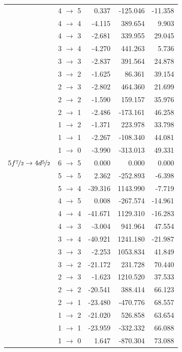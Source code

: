 \begin{table}[b]
\begin{small}
\begin{tabular}{cc|rrr}
&4 $\rightarrow$ 5&0.337&-125.046&-11.358\\
&4 $\rightarrow$ 4&-4.115&389.654&9.903\\
&4 $\rightarrow$ 3&-2.681&339.955&29.045\\
&3 $\rightarrow$ 4&-4.270&441.263&5.736\\
&3 $\rightarrow$ 3&-2.837&391.564&24.878\\
&3 $\rightarrow$ 2&-1.625&86.361&39.154\\
&2 $\rightarrow$ 3&-2.802&464.360&21.699\\
&2 $\rightarrow$ 2&-1.590&159.157&35.976\\
&2 $\rightarrow$ 1&-2.486&-173.161&46.258\\
&1 $\rightarrow$ 2&-1.371&223.978&33.798\\
&1 $\rightarrow$ 1&-2.267&-108.340&44.081\\
&1 $\rightarrow$ 0&-3.990&-313.013&49.331\\[10pt]
$5f\nicefrac{7}{2} \rightarrow 4d\nicefrac{5}{2}$ &6 $\rightarrow$ 5&0.000&0.000&0.000\\
&5 $\rightarrow$ 5&2.362&-252.893&-6.398\\
&5 $\rightarrow$ 4&-39.316&1143.990&-7.719\\
&4 $\rightarrow$ 5&0.008&-267.574&-14.961\\
&4 $\rightarrow$ 4&-41.671&1129.310&-16.283\\
&4 $\rightarrow$ 3&-3.004&941.964&47.554\\
&3 $\rightarrow$ 4&-40.921&1241.180&-21.987\\
&3 $\rightarrow$ 3&-2.253&1053.834&41.849\\
&3 $\rightarrow$ 2&-21.172&231.728&70.440\\
&2 $\rightarrow$ 3&-1.623&1210.520&37.533\\
&2 $\rightarrow$ 2&-20.541&388.414&66.123\\
&2 $\rightarrow$ 1&-23.480&-470.776&68.557\\
&1 $\rightarrow$ 2&-21.020&526.858&63.654\\
&1 $\rightarrow$ 1&-23.959&-332.332&66.088\\
&1 $\rightarrow$ 0&1.647&-870.304&73.088
\end{tabular}
\end{small}
\end{table}%
%
%
%
